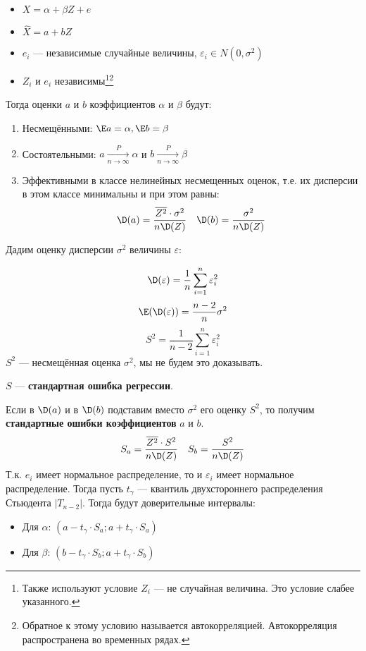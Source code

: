 \begin{theorem}\itemfix
    \begin{itemize}
        \item \(X = \alpha + \beta Z + e\)
        \item \(\hat{X} = a + bZ\)
        \item \(e_i\) --- независимые случайные величины, \(\varepsilon_i \in N(0, \sigma^2)\)
        \item \(Z_i\) и \(e_i\) независимы\footnote{Также используют условие \(Z_i\) --- не случайная величина. Это условие слабее указанного.}\footnote{Обратное к этому условию называется автокорреляцией. Автокорреляция распространена во временных рядах.}
    \end{itemize}

    Тогда оценки \(a\) и \(b\) коэффициентов \(\alpha\) и \(\beta\) будут:
    \begin{enumerate}
        \item Несмещёнными: \(\E a = \alpha, \E b = \beta\)
        \item Состоятельными: \(a \xrightarrow[n \to \infty]{P} \alpha\) и \(b \xrightarrow[n \to \infty]{P} \beta\)
        \item Эффективными в классе нелинейных несмещенных оценок, т.е. их дисперсии в этом классе минимальны и при этом равны:
              \[\D(a) = \frac{\overline{Z^2} \cdot \sigma^2}{n \D(Z)} \quad \D(b) = \frac{\sigma^2}{n \D(Z)}\]
    \end{enumerate}
\end{theorem}

Дадим оценку дисперсии \(\sigma^2\) величины \(\varepsilon\):

\[\D(\varepsilon) = \frac{1}{n} \sum_{i=1}^{n} \varepsilon_i^2\]
\[\E(\D(\varepsilon)) = \frac{n - 2}{n}\sigma^2\]
\[S^2 = \frac{1}{n - 2}\sum_{i=1}^{n} \varepsilon_i^2\]
\(S^2\) --- несмещённая оценка \(\sigma^2\), мы не будем это доказывать.
\begin{definition}
    \(S\) --- \textbf{стандартная ошибка регрессии}.
\end{definition}
Если в \(\D(a)\) и в \(\D(b)\) подставим вместо \(\sigma^2\) его оценку \(S^2\), то получим \textbf{стандартные ошибки коэффициентов} \(a\) и \(b\).
\[S_a = \frac{\overline{Z^2} \cdot S^2}{n \D(Z)} \quad S_b = \frac{S^2}{n \D(Z)}\]
Т.к. \(e_i\) имеет нормальное распределение, то и \(\varepsilon_i\) имеет нормальное распределение. Тогда пусть \(t_\gamma\) --- квантиль двухстороннего распределения Стьюдента \(|T_{n-2}|\). Тогда будут доверительные интервалы:
\begin{itemize}
    \item Для \(\alpha\): \((a - t_\gamma \cdot S_a; a + t_\gamma \cdot S_a)\)
    \item Для \(\beta\): \((b - t_\gamma \cdot S_b; a + t_\gamma \cdot S_b)\)
\end{itemize}

